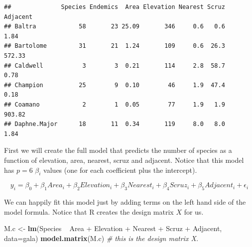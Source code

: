 \documentclass[]{book}
\newenvironment{Shaded}{\begin{snugshade}}{\end{snugshade}}
\newcommand{\KeywordTok}[1]{\textcolor[rgb]{0.13,0.29,0.53}{\textbf{{#1}}}}
\newcommand{\DataTypeTok}[1]{\textcolor[rgb]{0.13,0.29,0.53}{{#1}}}
\newcommand{\StringTok}[1]{\textcolor[rgb]{0.31,0.60,0.02}{{#1}}}
\newcommand{\CommentTok}[1]{\textcolor[rgb]{0.56,0.35,0.01}{\textit{{#1}}}}
\newcommand{\NormalTok}[1]{{#1}}
\theoremstyle{definition}
\theoremstyle{definition}
\theoremstyle{remark}
\begin{document}
\begin{verbatim}
##              Species Endemics  Area Elevation Nearest Scruz Adjacent
## Baltra            58       23 25.09       346     0.6   0.6     1.84
## Bartolome         31       21  1.24       109     0.6  26.3   572.33
## Caldwell           3        3  0.21       114     2.8  58.7     0.78
## Champion          25        9  0.10        46     1.9  47.4     0.18
## Coamano            2        1  0.05        77     1.9   1.9   903.82
## Daphne.Major      18       11  0.34       119     8.0   8.0     1.84
\end{verbatim}

First we will create the full model that predicts the number of species
as a function of elevation, area, nearest, scruz and adjacent. Notice
that this model has \(p=6\) \(\beta_{i}\) values (one for each
coefficient plus the intercept).

\[ y_i = \beta_0 + \beta_1 Area_i + \beta_2 Elevation_i + \beta_3 Nearest_i + \beta_4 Scruz_i + \beta_5 Adjacent_i + \epsilon_i\]

We can happily fit this model just by adding terms on the left hand side
of the model formula. Notice that R creates the design matrix \(X\) for
us.

\begin{Shaded}
\begin{Highlighting}[]
\NormalTok{M.c <-}\StringTok{ }\KeywordTok{lm}\NormalTok{(Species ~}\StringTok{ }\NormalTok{Area +}\StringTok{ }\NormalTok{Elevation +}\StringTok{ }\NormalTok{Nearest +}\StringTok{ }\NormalTok{Scruz +}\StringTok{ }\NormalTok{Adjacent, }\DataTypeTok{data=}\NormalTok{gala)}
\KeywordTok{model.matrix}\NormalTok{(M.c)  }\CommentTok{# this is the design matrix X.}
\end{Highlighting}
\end{Shaded}
\end{document}

